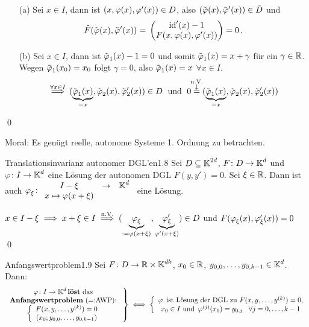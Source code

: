 \documentclass[a4paper]{article}
\begin{document}
\begin{Beweis}
\begin{itemize}
\item[(a)] Sei $x\in I$, dann ist $(x,\operatorname{\varphi}(x),\operatorname{\varphi}'(x))\in D$, also $(\tilde{\operatorname{\varphi}}(x),\tilde{\operatorname{\varphi}}'(x))\in\tilde{D}$ und
\[\tilde{F}(\tilde{\operatorname{\varphi}}(x),\tilde{\operatorname{\varphi}}'(x))=\mathop{}\begin{pmatrix}\operatorname{\mathrm{id}}'(x)-1\\F(x,\operatorname{\varphi}(x),\operatorname{\varphi}'(x))\end{pmatrix}=0\,.\]
\item[(b)] Sei $x\in I$, dann ist $\tilde{\operatorname{\varphi}}_1(x)-1=0$ und somit $\tilde{\operatorname{\varphi}}_1(x)=x+\gamma$ für ein $\gamma\in\mathbb R$. Wegen $\tilde{\operatorname{\varphi}}_1(x_0)=x_0$ folgt $\gamma=0$, also $\tilde{\operatorname{\varphi}}_1(x)=x$ $\forall x\in I$.
\[\overset{\forall x\in I}{\implies} (\underbrace{\tilde{\vp}_1(x)}_{=x},\tilde{\vp}_2(x),\tilde{\vp}_2'(x))\in D\;\te{und }\;0\overset{\ms{\text{n.V.}\\\downarrow}}{=} (\underbrace{\tilde{\vp}_1(x)}_{=x},\tilde{\vp}_2(x),\tilde{\vp}_2'(x))\]
\end{itemize}
\qed
\end{Beweis}

Moral: Es genügt reelle, autonome Systeme 1. Ordnung zu betrachten.

\begin{Lemma}{Translationsinvarianz autonomer DGL'en}{1.8}
Sei $D\subseteq \operatorname{\mathbb K}^{2d}$, $F\colon D\to\operatorname{\mathbb K}^d$ und $\operatorname{\varphi}\colon I\to\operatorname{\mathbb K}^d$ eine Lösung der autonomen DGL $F(y,y')=0$. Sei $\xi\in\mathbb R$. Dann ist auch $
\operatorname{\varphi}_{\xi}\colon\begin{array}{clc}
I-\xi&\to&\operatorname{\mathbb K}^d\\
x\mapsto \operatorname{\varphi}(x+\xi)
\end{array}$
eine Lösung.
\end{Lemma}

\begin{Beweis}
$x\in I-\xi\implies x+\xi\in I\overset{\text{n.V.}}{\implies} (\underbrace{\operatorname{\varphi}_{\xi}}_{:=\operatorname{\varphi}(x+\xi)},\underbrace{\operatorname{\varphi}_{\xi}'}_{\operatorname{\varphi}'(x+\xi)})\in D$ und $F(\operatorname{\varphi}_{\xi}(x),\operatorname{\varphi}_{\xi}'(x))=0$
\\\qed
\end{Beweis}

\begin{Def}{Anfangswertproblem}{1.9}
Sei $F\colon D\to \mathbb R\times \operatorname{\mathbb K}^{dk}$, $x_0\in\mathbb R$, $y_{0,0},\ldots, y_{0,k-1}\in\operatorname{\mathbb K}^d$. Dann:
\[\left. \begin{array}{c}
\operatorname{\varphi}\colon I\to\operatorname{\mathbb K}^d \textbf{löst}\text{ das }\\
\textbf{Anfangswertproblem}\text{ (=:AWP): }\\
\left\{\begin{array}{c}
        F(x,y,\ldots, y^{(k)})=0\\
        (x_0;y_{0,0},\ldots,y_{0,k-1})
    \end{array}\right.
\end{array}\right\} 
\iff 
\left\{\begin{array}{c}
         \operatorname{\varphi} \text{ ist Lösung der DGL zu $F(x,y,\ldots,y^{(k)})=0$,} \\
         x_0\in I\text{ und }\operatorname{\varphi}^{(j)}(x_0)=y_{0,j}\;\;\;\forall j=0,\ldots,k-1
    \end{array}\right.\]    
\end{Def}
\end{document}
